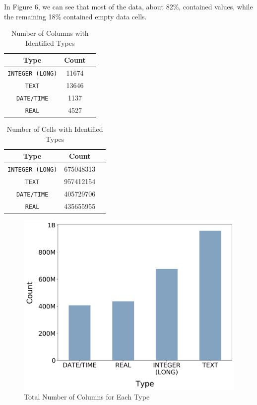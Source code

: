 \documentclass[sigconf,authordraft]{acmart}
\begin{document}
In Figure 6, we can see that most of the data, about 82\%, contained values, while the remaining 18\% contained empty data cells.

\begin{table}[h]
  \caption{Number of Columns with Identified Types}
  \label{tab:commands}
  \begin{tabular}{ccl}
    \toprule
    Type & Count\\
    \midrule
    \texttt{INTEGER (LONG)} & 11674 \\
    \texttt{TEXT} & 13646\\
    \texttt{DATE/TIME} &1137\\
    \texttt{REAL} & 4527\\
    \bottomrule
  \end{tabular}
\end{table}

\begin{table}[H]
  \caption{Number of Cells with Identified Types}
  \label{tab:commands}
  \begin{tabular}{ccl}
    \toprule
    Type & Count\\
    \midrule
    \texttt{INTEGER (LONG)} & 675048313 \\
    \texttt{TEXT} & 957412154 \\
    \texttt{DATE/TIME} & 405729706\\
    \texttt{REAL} & 435655955\\
    \bottomrule
  \end{tabular}
\end{table}

\begin{figure}[h]
  \centering
  \includegraphics[width=\linewidth]{tot_cols_for_each_type.png}
  \caption{Total Number of Columns for Each Type}
\end{figure}
\end{document}
